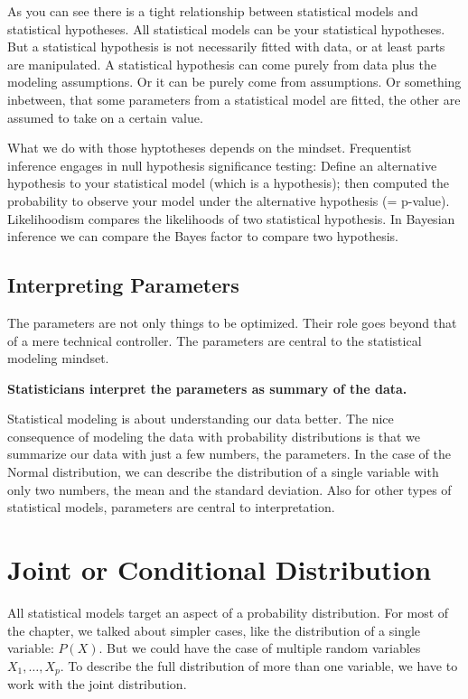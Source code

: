 \documentclass[
  10pt,
]{scrbook}
\begin{document}
As you can see there is a tight relationship between statistical models and statistical hypotheses.
All statistical models can be your statistical hypotheses.
But a statistical hypothesis is not necessarily fitted with data, or at least parts are manipulated.
A statistical hypothesis can come purely from data plus the modeling assumptions.
Or it can be purely come from assumptions.
Or something inbetween, that some parameters from a statistical model are fitted, the other are assumed to take on a certain value.

What we do with those hyptotheses depends on the mindset.
Frequentist inference engages in null hypothesis significance testing: Define an alternative hypothesis to your statistical model (which is a hypothesis); then computed the probability to observe your model under the alternative hypothesis (= p-value).
Likelihoodism compares the likelihoods of two statistical hypothesis.
In Bayesian inference we can compare the Bayes factor to compare two hypothesis.

\hypertarget{interpreting-parameters}{%
\subsection*{Interpreting Parameters}\label{interpreting-parameters}}


The parameters are not only things to be optimized.
Their role goes beyond that of a mere technical controller.
The parameters are central to the statistical modeling mindset.

\textbf{Statisticians interpret the parameters as summary of the data.}

Statistical modeling is about understanding our data better.
The nice consequence of modeling the data with probability distributions is that we summarize our data with just a few numbers, the parameters.
In the case of the Normal distribution, we can describe the distribution of a single variable with only two numbers, the mean and the standard deviation.
Also for other types of statistical models, parameters are central to interpretation.

\hypertarget{joint-or-conditional-distribution}{%
\section{Joint or Conditional Distribution}\label{joint-or-conditional-distribution}}

All statistical models target an aspect of a probability distribution.
For most of the chapter, we talked about simpler cases, like the distribution of a single variable: \(P(X)\).
But we could have the case of multiple random variables \(X_1, \ldots, X_p\).
To describe the full distribution of more than one variable, we have to work with the joint distribution.
\end{document}
